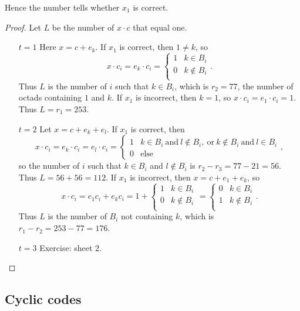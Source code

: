 
Hence the number tells whether $ x_1 $ is correct.

\begin{proof}
Let $ L $ be the number of $ x \cdot c $ that equal one.
\begin{itemize}
\item[$ t = 1 $] Here $ x = c + e_k $. If $ x_1 $ is correct, then $ 1 \ne k $, so
$$ x \cdot c_i = e_k \cdot c_i =
\begin{cases}
1 & k \in B_i \\
0 & k \notin B_i \\
\end{cases}.
$$
Thus $ L $ is the number of $ i $ such that $ k \in B_i $, which is $ r_2 = 77 $, the number of octads containing $ 1 $ and $ k $. If $ x_1 $ is incorrect, then $ k = 1 $, so $ x \cdot c_i = e_1 \cdot c_i = 1 $. Thus $ L = r_1 = 253 $.
\item[$ t = 2 $] Let $ x = c + e_k + e_l $. If $ x_1 $ is correct, then
$$ x \cdot c_i = e_k \cdot c_i = e_l \cdot c_i =
\begin{cases}
1 & k \in B_i \ \text{and} \ l \notin B_i, \ \text{or} \ k \notin B_i \ \text{and} \ l \in B_i \\
0 & \text{else}
\end{cases},
$$
so the number of $ i $ such that $ k \in B_i $ and $ l \notin B_i $ is $ r_2 - r_3 = 77 - 21 = 56 $. Thus $ L = 56 + 56 = 112 $. If $ x_1 $ is incorrect, then $ x = c + e_1 + e_k $, so
$$ x \cdot c_i = e_1c_i + e_kc_i = 1 +
\begin{cases}
1 & k \in B_i \\
0 & k \notin B_i \\
\end{cases}
=
\begin{cases}
0 & k \in B_i \\
1 & k \notin B_i \\
\end{cases}.
$$
Thus $ L $ is the number of $ B_i $ not containing $ k $, which is $ r_1 - r_2 = 253 - 77 = 176 $.
\item[$ t = 3 $] Exercise: sheet $ 2 $.
\end{itemize}
\end{proof}

\pagebreak

\subsection{Cyclic codes}


